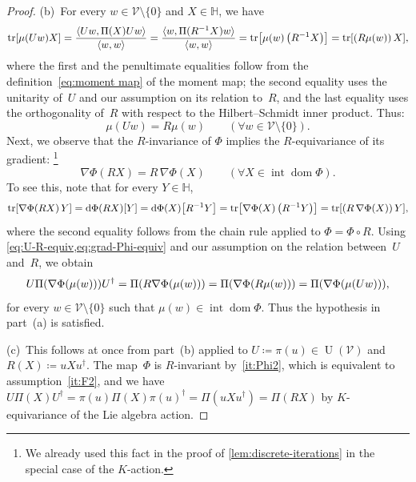 \documentclass[11pt,letterpaper]{article}
\numberwithin{equation}{section}
\newcommand{\bbH}{\mathbb{H}}
\newcommand{\diff}{\mathrm{d}}
\newcommand{\VV}{\mathcal{V}}
\DeclareMathOperator{\intr}{int}
\DeclareMathOperator{\dom}{dom}
\DeclareMathOperator{\U}{U}
\DeclareMathOperator{\tr}{tr}
\begin{document}
\begin{proof}
(b)~For every $w\in\VV\setminus\{0\}$ and $X\in\bbH$, we have
\[
\tr[\mu(Uw)X]
=\frac{\langle Uw,\Pi(X)Uw\rangle}{\langle w,w\rangle}
=\frac{\langle w,\Pi(R^{-1}X)w\rangle}{\langle w,w\rangle}
=\tr\mleft[\mu(w)\left(R^{-1}X\right)\mright]
=\tr\mleft[\left(R\mu(w)\right)X\mright],
\]
where the first and the penultimate equalities follow from the definition~\eqref{eq:moment map} of the moment map;
the second equality uses the unitarity of~$U$ and our assumption on its relation to~$R$,
and the last equality uses the orthogonality of~$R$ with respect to the Hilbert--Schmidt inner product.
Thus:
\begin{equation}\label{eq:U-R-equiv}
    \mu(Uw) = R\mu(w) \qquad (\forall w\in\VV\setminus\{0\}).
\end{equation}
Next, we observe that the $R$-invariance of $\Phi$ implies the $R$-equivariance of its gradient:%
\footnote{We already used this fact in the proof of \cref{lem:discrete-iterations} in the special case of the $K$-action.}
\begin{equation}\label{eq:grad-Phi-equiv}
\nabla\Phi(RX)= R\,\nabla\Phi(X) \qquad (\forall X \in \intr\dom\Phi).
\end{equation}
To see this, note that for every $Y\in\bbH$,
\[
    \tr[\nabla\Phi(RX) \, Y]
    =\diff\Phi(RX)[Y]
    =\diff\Phi(X)\mleft[R^{-1}Y\mright]
    =\tr\mleft[\nabla\Phi(X) \left(R^{-1}Y\right)\mright]
    =\tr[(R \, \nabla\Phi(X))\, Y],
\]
where the second equality follows from the chain rule applied to $\Phi = \Phi \circ R$.
Using \cref{eq:U-R-equiv,eq:grad-Phi-equiv} and our assumption on the relation between~$U$ and~$R$, we obtain
\begin{equation*}
    U\Pi\mleft(\nabla\Phi(\mu(w))\mright)U^\dagger = \Pi\mleft(R\nabla\Phi(\mu(w))\mright) = \Pi\mleft(\nabla\Phi(R\mu(w))\mright) = \Pi\mleft(\nabla\Phi(\mu(Uw))\mright),
\end{equation*}
for every $w \in \VV \setminus \{0\}$ such that $\mu(w) \in \intr\dom\Phi$.
Thus the hypothesis in part~(a) is satisfied.

(c)~This follows at once from part~(b) applied to $U \coloneqq \pi(u) \in \U(\VV)$ and $R(X) \coloneqq u X u^\dagger$.
The map~$\Phi$ is $R$-invariant by~\ref{it:Phi2}, which is equivalent to assumption~\ref{it:F2}, and we have $U \Pi(X) U^\dagger = \pi(u) \Pi(X) \pi(u)^\dagger = \Pi(u X u^\dagger) = \Pi(RX)$ by $K$-equivariance of the Lie algebra action.
\end{proof}
\end{document}

